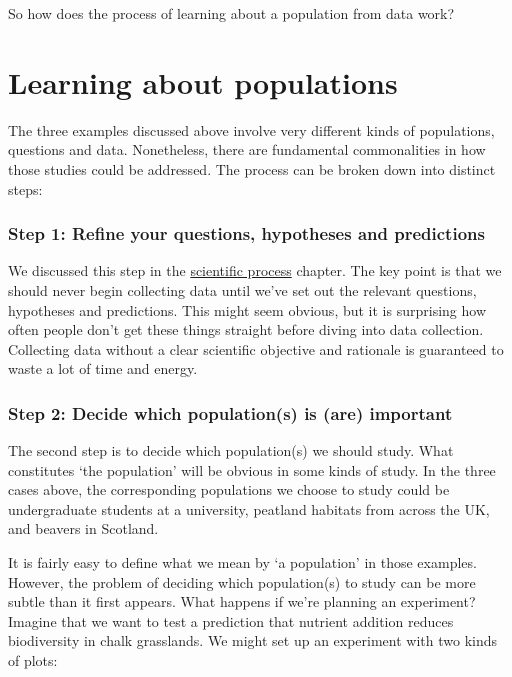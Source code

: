\documentclass[
]{book}
\begin{document}
So how does the process of learning about a population from data work?

\hypertarget{learning-about-populations}{%
\section{Learning about populations}\label{learning-about-populations}}

The three examples discussed above involve very different kinds of populations, questions and data. Nonetheless, there are fundamental commonalities in how those studies could be addressed. The process can be broken down into distinct steps:

\hypertarget{step-1-refine-your-questions-hypotheses-and-predictions}{%
\subsubsection*{Step 1: Refine your questions, hypotheses and predictions}\label{step-1-refine-your-questions-hypotheses-and-predictions}}

We discussed this step in the \protect\hyperlink{scientific-process}{scientific process} chapter. The key point is that we should never begin collecting data until we've set out the relevant questions, hypotheses and predictions. This might seem obvious, but it is surprising how often people don't get these things straight before diving into data collection. Collecting data without a clear scientific objective and rationale is guaranteed to waste a lot of time and energy.

\hypertarget{step-2-decide-which-populations-is-are-important}{%
\subsubsection*{Step 2: Decide which population(s) is (are) important}\label{step-2-decide-which-populations-is-are-important}}

The second step is to decide which population(s) we should study. What constitutes `the population' will be obvious in some kinds of study. In the three cases above, the corresponding populations we choose to study could be undergraduate students at a university, peatland habitats from across the UK, and beavers in Scotland.

It is fairly easy to define what we mean by `a population' in those examples. However, the problem of deciding which population(s) to study can be more subtle than it first appears. What happens if we're planning an experiment? Imagine that we want to test a prediction that nutrient addition reduces biodiversity in chalk grasslands. We might set up an experiment with two kinds of plots:
\end{document}
